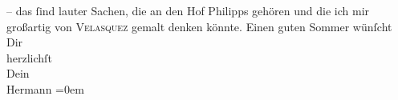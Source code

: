 \begin{ledgroupsized}[t]{13cm}
               – das ſind lauter Sachen, die an den Hof Philipps gehören und die ich mir großartig von \textsc{Velasquez} gemalt denken könnte.\pend
           \pstart
           Einen guten Sommer wünſcht Dir{\\[\baselineskip]}herzlichſt{\\[\baselineskip]}Dein{\\[\baselineskip]}\spacefill\mbox{Hermann}\pend
           \leftskip=0em{}
         
         \endnumbering{}\end{ledgroupsized}  \newcommand{\dateiname}{L01143}\newcommand{\titel}{Hermann Bahr an Arthur Schnitzler, 5. 7. 1901}\newcommand{\editorInnen}{ Kurt Ifkovits,  Martin Anton Müller}
      